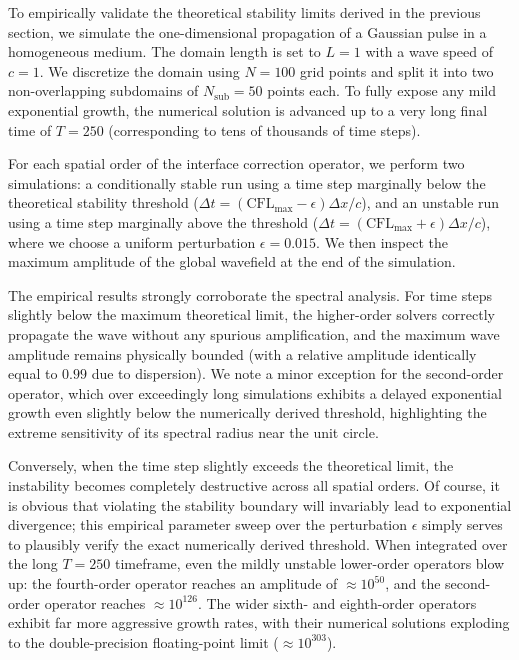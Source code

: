 \documentclass{Configuration_Files/PoliMi3i_thesis}
\begin{document}
To empirically validate the theoretical stability limits derived in the previous section, we simulate the one-dimensional propagation of a Gaussian pulse in a homogeneous medium. The domain length is set to $L=1$ with a wave speed of $c=1$. We discretize the domain using $N=100$ grid points and split it into two non-overlapping subdomains of $N_{\mathrm{sub}}=50$ points each. To fully expose any mild exponential growth, the numerical solution is advanced up to a very long final time of $T=250$ (corresponding to tens of thousands of time steps).

For each spatial order of the interface correction operator, we perform two simulations: a conditionally stable run using a time step marginally below the theoretical stability threshold ($\Delta t = (\mathrm{CFL}_{\max} - \epsilon)\Delta x / c$), and an unstable run using a time step marginally above the threshold ($\Delta t = (\mathrm{CFL}_{\max} + \epsilon)\Delta x / c$), where we choose a uniform perturbation $\epsilon = 0.015$. We then inspect the maximum amplitude of the global wavefield at the end of the simulation.

The empirical results strongly corroborate the spectral analysis. For time steps slightly below the maximum theoretical limit, the higher-order solvers correctly propagate the wave without any spurious amplification, and the maximum wave amplitude remains physically bounded (with a relative amplitude identically equal to $0.99$ due to dispersion). We note a minor exception for the second-order operator, which over exceedingly long simulations exhibits a delayed exponential growth even slightly below the numerically derived threshold, highlighting the extreme sensitivity of its spectral radius near the unit circle.

Conversely, when the time step slightly exceeds the theoretical limit, the instability becomes completely destructive across all spatial orders. Of course, it is obvious that violating the stability boundary will invariably lead to exponential divergence; this empirical parameter sweep over the perturbation $\epsilon$ simply serves to plausibly verify the exact numerically derived threshold. When integrated over the long $T=250$ timeframe, even the mildly unstable lower-order operators blow up: the fourth-order operator reaches an amplitude of $\approx 10^{50}$, and the second-order operator reaches $\approx 10^{126}$. The wider sixth- and eighth-order operators exhibit far more aggressive growth rates, with their numerical solutions exploding to the double-precision floating-point limit ($\approx 10^{303}$).
\end{document}
